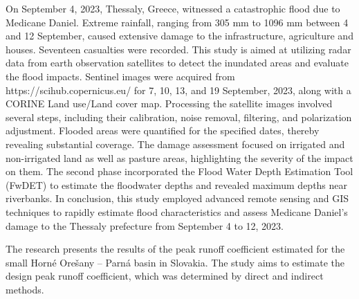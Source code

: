 On September 4, 2023, Thessaly, Greece, witnessed a catastrophic flood due to Medicane Daniel. Extreme rainfall, ranging from 305 mm to 1096 mm between 4 and 12 September, caused extensive damage to the infrastructure, agriculture and houses. Seventeen casualties were recorded. This study is aimed at utilizing radar data from earth observation satellites to detect the inundated areas and evaluate the flood impacts. Sentinel images were acquired from https://scihub.copernicus.eu/ for 7, 10, 13, and 19 September, 2023, along with a CORINE Land use/Land cover map. Processing the satellite images involved several steps, including their calibration, noise removal, filtering, and polarization adjustment. Flooded areas were quantified for the specified dates, thereby revealing substantial coverage. The damage assessment focused on irrigated and non-irrigated land as well as pasture areas, highlighting the severity of the impact on them. The second phase incorporated the Flood Water Depth Estimation Tool (FwDET) to estimate the floodwater depths and revealed maximum depths near riverbanks. In conclusion, this study employed advanced remote sensing and GIS techniques to rapidly estimate flood characteristics and assess Medicane Daniel's damage to the Thessaly prefecture from September 4 to 12, 2023.


\newpage{}
{}
\begin{flushleft}





\end{flushleft}

\noindent

The research presents the results of the peak runoff coefficient estimated for the small Horné Orešany – Parná basin in Slovakia. The study aims to estimate the design peak runoff coefficient, which was determined by direct and indirect methods.

